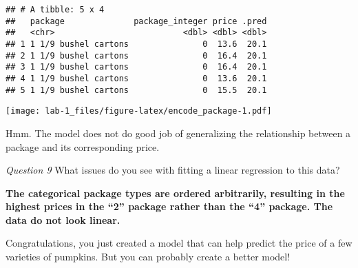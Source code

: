\documentclass[
]{article}
\begin{document}
\begin{verbatim}
## # A tibble: 5 x 4
##   package              package_integer price .pred
##   <chr>                          <dbl> <dbl> <dbl>
## 1 1 1/9 bushel cartons               0  13.6  20.1
## 2 1 1/9 bushel cartons               0  16.4  20.1
## 3 1 1/9 bushel cartons               0  16.4  20.1
## 4 1 1/9 bushel cartons               0  13.6  20.1
## 5 1 1/9 bushel cartons               0  15.5  20.1
\end{verbatim}

\texttt{[image: lab-1\_files/figure-latex/encode\_package-1.pdf]}

Hmm. The model does not do good job of generalizing the relationship
between a package and its corresponding price.

\emph{Question 9} What issues do you see with fitting a linear
regression to this data?

\textbf{The categorical package types are ordered arbitrarily, resulting
in the highest prices in the ``2'' package rather than the ``4''
package. The data do not look linear.}

Congratulations, you just created a model that can help predict the
price of a few varieties of pumpkins. But you can probably create a
better model!
\end{document}

